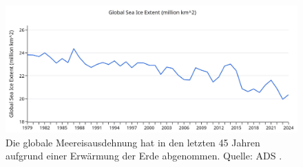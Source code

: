 \documentclass[10pt,twocolumn,letterpaper]{article}
\renewcommand{\refname}{Literaturverzeichnis}
\begin{document}
\begin{figure}[t]
\begin{center}
\includegraphics[width=1\textwidth]{ice.jpg}
\end{center}

   \caption{Die globale Meereisausdehnung hat in den letzten 45 Jahren aufgrund einer Erwärmung der Erde abgenommen. Quelle: ADS \cite{149}.}
\label{fig:24}
\end{figure}

\clearpage
\twocolumn

{\small


}
\end{document}
